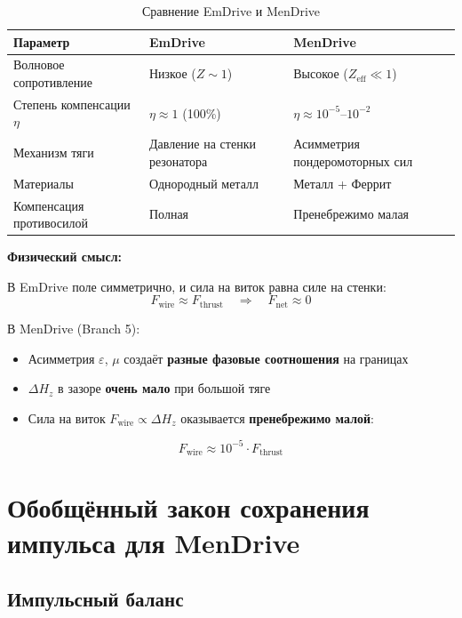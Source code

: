 \documentclass[a4paper,12pt]{article}
\begin{document}
{\begin{table}[H]
\centering
\caption{Сравнение EmDrive и MenDrive}
\label{tab:emdrive_vs_mendrive}
\begin{tabular}{@{}lll@{}}
\toprule
\textbf{Параметр} & \textbf{EmDrive} & \textbf{MenDrive} \\
\midrule
Волновое сопротивление & Низкое ($Z \sim 1$) & Высокое ($Z_{\text{eff}} \ll 1$) \\
Степень компенсации $\eta$ & $\eta \approx 1$ (100\%) & $\eta \approx 10^{-5}$--$10^{-2}$ \\
Механизм тяги & Давление на стенки резонатора & Асимметрия пондеромоторных сил \\
Материалы & Однородный металл & Металл + Феррит \\
Компенсация противосилой & Полная & Пренебрежимо малая \\
\bottomrule
\end{tabular}
\end{table}

\textbf{Физический смысл:}

В EmDrive поле симметрично, и сила на виток равна силе на стенки:
\begin{equation}
F_{\text{wire}} \approx F_{\text{thrust}} \quad \Rightarrow \quad
F_{\text{net}} \approx 0
\label{eq:emdrive_balance}
\end{equation}

В MenDrive (Branch 5):
\begin{itemize}
    \item Асимметрия $\varepsilon$, $\mu$ создаёт \textbf{разные фазовые
    соотношения} на границах
    \item $\Delta H_z$ в зазоре \textbf{очень мало} при большой тяге
    \item Сила на виток $F_{\text{wire}} \propto \Delta H_z$ оказывается
    \textbf{пренебрежимо малой}:
\end{itemize}

\begin{equation}
F_{\text{wire}} \approx 10^{-5} \cdot F_{\text{thrust}}
\label{eq:mendrive_wire}
\end{equation}

\section{Обобщённый закон сохранения импульса для MenDrive}

\subsection{Импульсный баланс}

}
\end{document}
